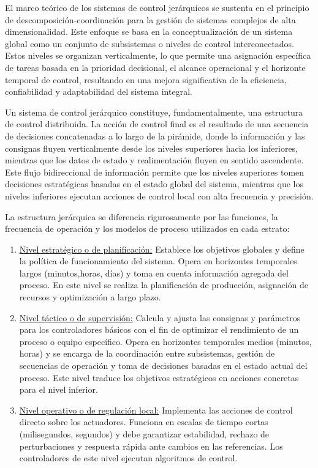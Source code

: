 El marco teórico de los sistemas de control jerárquicos se sustenta en el principio de descomposición-coordinación para la gestión de sistemas complejos de alta dimensionalidad. Este enfoque se basa en la conceptualización de un sistema global como un conjunto de subsistemas o niveles de control interconectados. Estos niveles se organizan verticalmente, lo que permite una asignación específica de tareas basada en la prioridad decisional, el alcance operacional y el horizonte temporal de control, resultando en una mejora significativa de la eficiencia, confiabilidad y adaptabilidad del sistema integral.

Un sistema de control jerárquico constituye, fundamentalmente, una estructura de control distribuida. La acción de control final es el resultado de una secuencia de decisiones concatenadas a lo largo de la pirámide, donde la información y las consignas fluyen verticalmente desde los niveles superiores hacia los inferiores, mientras que los datos de estado y realimentación fluyen en sentido ascendente. Este flujo bidireccional de información permite que los niveles superiores tomen decisiones estratégicas basadas en el estado global del sistema, mientras que los niveles inferiores ejecutan acciones de control local con alta frecuencia y precisión.

La estructura jerárquica se diferencia rigurosamente por las funciones, la frecuencia de operación y los modelos de proceso utilizados en cada estrato:
\begin{enumerate}

\item \underline{Nivel estratégico o de planificación:} Establece los objetivos globales y define la política de funcionamiento del sistema. Opera en horizontes temporales largos (minutos,horas, días) y toma en cuenta información agregada del proceso. En este nivel se realiza la planificación de producción, asignación de recursos y optimización a largo plazo.

\item \underline{Nivel táctico o de supervisión:} Calcula y ajusta las consignas y parámetros para los controladores básicos con el fin de optimizar el rendimiento de un proceso o equipo específico. Opera en horizontes temporales medios (minutos, horas) y se encarga de la coordinación entre subsistemas, gestión de secuencias de operación y toma de decisiones basadas en el estado actual del proceso. Este nivel traduce los objetivos estratégicos en acciones concretas para el nivel inferior.

\item \underline{Nivel operativo o de regulación local:} Implementa las acciones de control directo sobre los actuadores. Funciona en escalas de tiempo cortas (milisegundos, segundos) y debe garantizar estabilidad, rechazo de perturbaciones y respuesta rápida ante cambios en las referencias. Los controladores de este nivel ejecutan algoritmos de control.

\end{enumerate}

